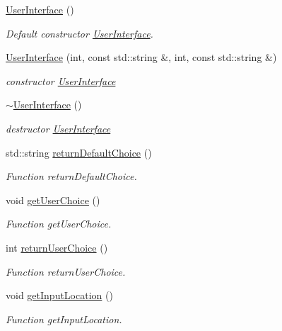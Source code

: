 \begin{DoxyCompactItemize}
\item 
\hyperlink{classUserInterface_ae6fb70370701b3bd6120e923df9705b0}{User\+Interface} ()
\begin{DoxyCompactList}\small\item\em Default constructor \hyperlink{classUserInterface}{User\+Interface}. \end{DoxyCompactList}\item 
\hyperlink{classUserInterface_a0d6b9486d437a4d18c5a7bec6781de9a}{User\+Interface} (int, const std\+::string \&, int, const std\+::string \&)
\begin{DoxyCompactList}\small\item\em constructor \hyperlink{classUserInterface}{User\+Interface} \end{DoxyCompactList}\item 
\hyperlink{classUserInterface_ae588b2ff1711a016dd4c6fc5002c0841}{$\sim$\+User\+Interface} ()
\begin{DoxyCompactList}\small\item\em destructor \hyperlink{classUserInterface}{User\+Interface} \end{DoxyCompactList}\item 
std\+::string \hyperlink{classUserInterface_a90bc99e42cda74b901cad6983b8081c7}{return\+Default\+Choice} ()
\begin{DoxyCompactList}\small\item\em Function return\+Default\+Choice. \end{DoxyCompactList}\item 
void \hyperlink{classUserInterface_a4d4098f59d11a180704a5f8e415fa4fd}{get\+User\+Choice} ()
\begin{DoxyCompactList}\small\item\em Function get\+User\+Choice. \end{DoxyCompactList}\item 
int \hyperlink{classUserInterface_a65eb4d8676fe792af4dd037084273421}{return\+User\+Choice} ()
\begin{DoxyCompactList}\small\item\em Function return\+User\+Choice. \end{DoxyCompactList}\item 
void \hyperlink{classUserInterface_acb2302084e8e62740a6e6720bbb700ea}{get\+Input\+Location} ()
\begin{DoxyCompactList}\small\item\em Function get\+Input\+Location. \end{DoxyCompactList}\item 

\end{DoxyCompactItemize}

